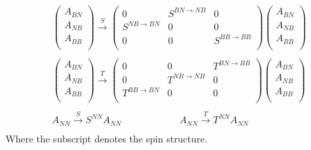 \documentclass[12pt,a4paper]{article}
\newcounter{arrow}
\begin{document}
\begin{align}
\left(\begin{matrix}
A_{BN}\\
A_{NB} \\
A_{BB} \\
\end{matrix} \right)
\xrightarrow{S} \left( \begin{matrix}
0 & S^{BN \rightarrow NB} &0 \\
S^{NB \rightarrow BN} & 0 & 0 \\
0& 0 & S^{BB \rightarrow BB} \\
\end{matrix} \right)
\left(\begin{matrix}
A_{BN}\\
A_{NB} \\
A_{BB} \\
\end{matrix} \right)\\
\\
\left(\begin{matrix}
A_{BN}\\
A_{NB} \\
A_{BB} \\
\end{matrix} \right)
\xrightarrow{T} \left( \begin{matrix}
0 & 0 & T^{BN \rightarrow BB} \\
0 & T^{NB \rightarrow NB} & 0 \\
T^{BB \rightarrow BN} & 0 & 0 \\
\end{matrix} \right)
\left(\begin{matrix}
A_{BN}\\
A_{NB} \\
A_{BB} \\
\end{matrix} \right) \\
\\
A_{NN} \xrightarrow{S} S^{NN} A_{NN} \qquad\qquad\qquad  A_{NN} \xrightarrow{T} T^{NN} A_{NN} \\
\end{align}
Where the subscript denotes the spin structure. 
\end{document}
